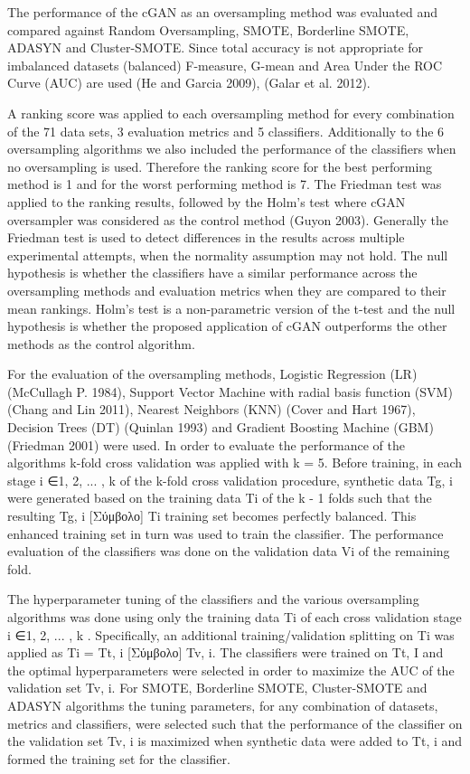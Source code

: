 \documentclass[parskip=full]{scrartcl}
\begin{document}
The performance of the cGAN as an oversampling method was evaluated and compared
against Random Oversampling, SMOTE, Borderline SMOTE, ADASYN and Cluster-SMOTE.
Since total accuracy is not appropriate for imbalanced datasets (balanced)
F-measure, G-mean and Area Under the ROC Curve (AUC) are used (He and Garcia
2009), (Galar et al. 2012). 

A ranking score was applied to each oversampling method for every combination of
the 71 data sets, 3 evaluation metrics and 5 classifiers. Additionally to the 6
oversampling algorithms we also included the performance of the classifiers when
no oversampling is used. Therefore the ranking score for the best performing
method is 1 and for the worst performing method is 7. The Friedman test was
applied to the ranking results, followed by the Holm’s test where cGAN
oversampler was considered as the control method (Guyon 2003). Generally the
Friedman test is used to detect differences in the results across multiple
experimental attempts, when the normality assumption may not hold. The null
hypothesis is whether the classifiers have a similar performance across the
oversampling methods and evaluation metrics when they are compared to their mean
rankings. Holm’s test is a non-parametric version of the t-test and the null
hypothesis is whether the proposed application of cGAN outperforms the other
methods as the control algorithm.  

For the evaluation of the oversampling methods, Logistic Regression (LR)
(McCullagh P. 1984), Support Vector Machine with radial basis function (SVM)
(Chang and Lin 2011), Nearest Neighbors (KNN) (Cover and Hart 1967), Decision
Trees (DT) (Quinlan 1993) and Gradient Boosting Machine (GBM) (Friedman 2001)
were used. In order to evaluate the performance of the algorithms k-fold cross
validation was applied with k = 5. Before training, in each stage i ∈{1, 2,  ...
, k} of the k-fold cross validation procedure, synthetic data Tg, i were
generated based on the training data Ti of the k - 1 folds such that the
resulting Tg, i [Σύμβολο] Ti training set becomes perfectly balanced. This
enhanced training set in turn was used to train the classifier. The performance
evaluation of the classifiers was done on the validation data Vi of the
remaining fold.  

The hyperparameter tuning of the classifiers and the various oversampling
algorithms was done using only the training data Ti of each cross validation
stage i ∈{1, 2,  ... , k} . Specifically, an additional training/validation
splitting on Ti was applied as Ti = Tt, i [Σύμβολο] Tv, i. The classifiers were
trained on Tt, I and the optimal hyperparameters were selected in order to
maximize the AUC of the validation set Tv, i. For SMOTE, Borderline SMOTE,
Cluster-SMOTE and ADASYN algorithms the tuning parameters, for any combination
of datasets, metrics and classifiers, were selected such that the performance of
the classifier on the validation set Tv, i is maximized when synthetic data were
added to Tt, i and formed the training set for the classifier.  
\end{document}
